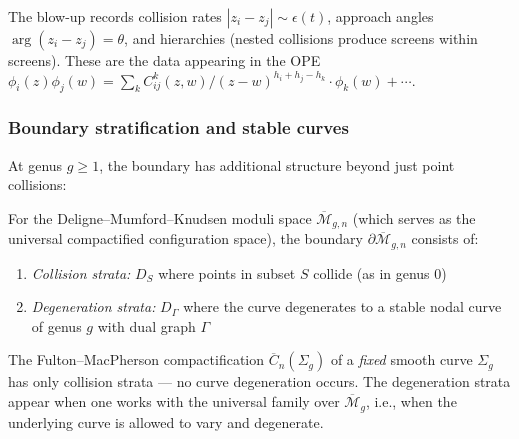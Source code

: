 \begin{remark}\label{rem:recording-collisions}
The blow-up records collision rates $|z_i - z_j| \sim \epsilon(t)$, approach angles $\arg(z_i - z_j) = \theta$, and hierarchies (nested collisions produce screens within screens).  These are the data appearing in the OPE $\phi_i(z)\phi_j(w) = \sum_k C_{ij}^k(z,w)/(z-w)^{h_i+h_j-h_k} \cdot \phi_k(w) + \cdots$.
\end{remark}

\subsubsection{Boundary stratification and stable curves}

At genus $g \geq 1$, the boundary has additional structure beyond just point collisions:

\begin{theorem}\label{thm:boundary-higher-genus}
For the Deligne--Mumford--Knudsen moduli space $\overline{\mathcal{M}}_{g,n}$ (which serves as the universal compactified configuration space), the boundary $\partial\overline{\mathcal{M}}_{g,n}$ consists of:

\begin{enumerate}
\item \emph{Collision strata:} $D_S$ where points in subset $S$ collide (as in genus 0)
\item \emph{Degeneration strata:} $D_{\Gamma}$ where the curve degenerates to a stable nodal curve of genus $g$ with dual graph $\Gamma$
\end{enumerate}

The Fulton--MacPherson compactification $\overline{C}_n(\Sigma_g)$ of a \emph{fixed} smooth curve $\Sigma_g$ has only collision strata --- no curve degeneration occurs. The degeneration strata appear when one works with the universal family over $\overline{\mathcal{M}}_g$, i.e., when the underlying curve is allowed to vary and degenerate.
\end{theorem}

